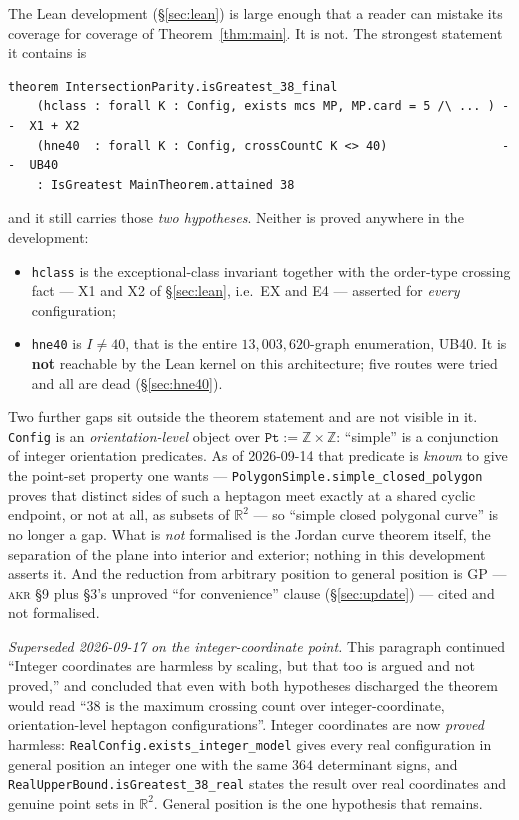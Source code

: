 \documentclass[11pt,a4paper]{article}
\theoremstyle{plain}
\theoremstyle{definition}
\theoremstyle{remark}
\begin{document}
The Lean development (\S\ref{sec:lean}) is large enough that a reader can
mistake its coverage for coverage of Theorem~\ref{thm:main}. It is not. The
strongest statement it contains is

{\footnotesize\begin{verbatim}
theorem IntersectionParity.isGreatest_38_final
    (hclass : forall K : Config, exists mcs MP, MP.card = 5 /\ ... ) --  X1 + X2
    (hne40  : forall K : Config, crossCountC K <> 40)                --  UB40
    : IsGreatest MainTheorem.attained 38
\end{verbatim}}

\noindent
and it still carries those \emph{two hypotheses}. Neither is proved anywhere in
the development:
\begin{itemize}[leftmargin=*,nosep]
  \item \texttt{hclass} is the exceptional-class invariant together with the
    order-type crossing fact --- \textsf{X1} and \textsf{X2} of
    \S\ref{sec:lean}, i.e.\ \textsf{EX} and \textsf{E4} --- asserted for
    \emph{every} configuration;
  \item \texttt{hne40} is $I\neq40$, that is the entire $13{,}003{,}620$-graph
    enumeration, \textsf{UB40}. It is \textbf{not} reachable by the Lean kernel
    on this architecture; five routes were tried and all are dead
    (\S\ref{sec:hne40}).
\end{itemize}

Two further gaps sit outside the theorem statement and are not visible in it.
\texttt{Config} is an \emph{orientation-level} object over
$\texttt{Pt}:=\mathbb{Z}\times\mathbb{Z}$: ``simple'' is a conjunction of integer
orientation predicates. As of 2026-09-14 that predicate is \emph{known} to give
the point-set property one wants --- \texttt{PolygonSimple.simple\_closed\_polygon}
proves that distinct sides of such a heptagon meet exactly at a shared cyclic
endpoint, or not at all, as subsets of $\mathbb{R}^2$ --- so ``simple closed
polygonal curve'' is no longer a gap. What is \emph{not} formalised is the Jordan
curve theorem itself, the separation of the plane into interior and exterior;
nothing in this development asserts it. And the reduction from arbitrary position
to general position is \textsf{GP} --- \textsc{akr} \S9 plus \S3's unproved
``for convenience'' clause (\S\ref{sec:update}) --- cited and not formalised.

\emph{Superseded 2026-09-17 on the integer-coordinate point.} This paragraph
continued ``Integer coordinates are harmless by scaling, but that too is argued
and not proved,'' and concluded that even with both hypotheses discharged the
theorem would read ``$38$ is the maximum crossing count over integer-coordinate,
orientation-level heptagon configurations''. Integer coordinates are now
\emph{proved} harmless: \texttt{RealConfig.exists\_integer\_model} gives every
real configuration in general position an integer one with the same $364$
determinant signs, and \texttt{RealUpperBound.isGreatest\_38\_real} states the
result over real coordinates and genuine point sets in $\mathbb{R}^2$. General
position is the one hypothesis that remains.
\end{document}
